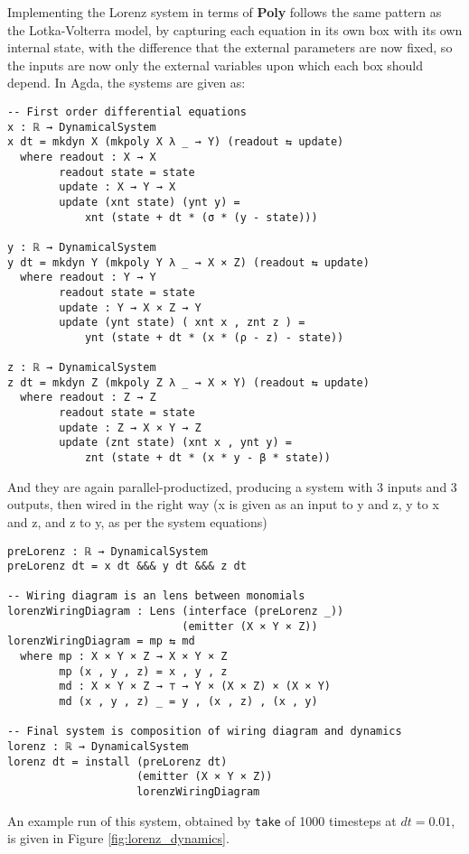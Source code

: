 Implementing the Lorenz system in terms of \textbf{Poly} follows the same pattern as the Lotka-Volterra model, by capturing each equation in its own box with its own internal state, with the difference that the external parameters are now fixed, so the inputs are now only the external variables upon which each box should depend. In Agda, the systems are given as:
\begin{verbatim}
-- First order differential equations
x : ℝ → DynamicalSystem
x dt = mkdyn X (mkpoly X λ _ → Y) (readout ⇆ update)
  where readout : X → X
        readout state = state
        update : X → Y → X
        update (xnt state) (ynt y) = 
            xnt (state + dt * (σ * (y - state)))

y : ℝ → DynamicalSystem
y dt = mkdyn Y (mkpoly Y λ _ → X × Z) (readout ⇆ update)
  where readout : Y → Y
        readout state = state
        update : Y → X × Z → Y
        update (ynt state) ( xnt x , znt z ) = 
            ynt (state + dt * (x * (ρ - z) - state))

z : ℝ → DynamicalSystem
z dt = mkdyn Z (mkpoly Z λ _ → X × Y) (readout ⇆ update)
  where readout : Z → Z
        readout state = state
        update : Z → X × Y → Z
        update (znt state) (xnt x , ynt y) = 
            znt (state + dt * (x * y - β * state))
\end{verbatim}
And they are again parallel-productized, producing a system with 3 inputs and 3 outputs, then wired in the right way (x is given as an input to y and z, y to x and z, and z to y, as per the system equations)

\begin{verbatim}
preLorenz : ℝ → DynamicalSystem
preLorenz dt = x dt &&& y dt &&& z dt

-- Wiring diagram is an lens between monomials
lorenzWiringDiagram : Lens (interface (preLorenz _))
                           (emitter (X × Y × Z))
lorenzWiringDiagram = mp ⇆ md
  where mp : X × Y × Z → X × Y × Z
        mp (x , y , z) = x , y , z
        md : X × Y × Z → ⊤ → Y × (X × Z) × (X × Y)
        md (x , y , z) _ = y , (x , z) , (x , y)

-- Final system is composition of wiring diagram and dynamics
lorenz : ℝ → DynamicalSystem
lorenz dt = install (preLorenz dt)
                    (emitter (X × Y × Z))
                    lorenzWiringDiagram
\end{verbatim}

An example run of this system, obtained by \texttt{take} of 1000 timesteps at $dt = 0.01$, is given in Figure \ref{fig:lorenz_dynamics}.

